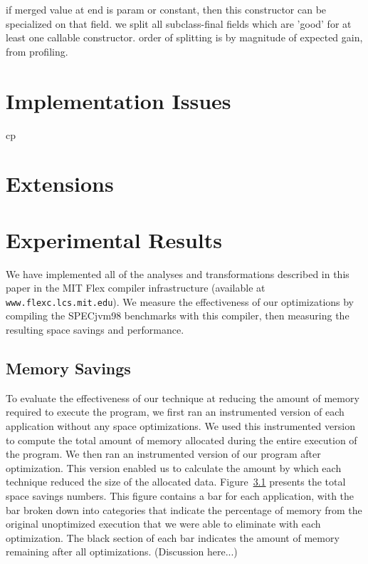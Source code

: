 \documentclass{acmconf}
\begin{document}
if merged value at end is param or constant, then this constructor
can be specialized on that field.  we split all subclass-final fields
which are 'good' for at least one callable constructor.  order of
splitting is by magnitude of expected gain, from profiling.

\section{Implementation Issues}


cp \section{Extensions} %

\section{Experimental Results}
\label{sec:results}

We have implemented all of the analyses and transformations described
in this paper in the MIT Flex compiler infrastructure 
(available at {\tt www.flexc.lcs.mit.edu}). We measure the effectiveness
of our optimizations by compiling the SPECjvm98 benchmarks with 
this compiler, then measuring the resulting space savings and
performance. 

\subsection{Memory Savings}

To evaluate the effectiveness of our technique at reducing the
amount of memory required to execute the program, 
we first ran an instrumented version of each
application without any space optimizations. We used this
instrumented version to compute the total amount of memory 
allocated during the entire execution of the program. 
We then ran an instrumented version of our program after optimization.
This version enabled us to calculate the amount by which each 
technique reduced the size of the allocated data. 
Figure~\ref{} presents the total space savings numbers. This
figure contains a bar for each application, with the bar broken
down into categories that indicate the percentage of memory from 
the original unoptimized execution that we were able to eliminate
with each optimization. The black section of each bar indicates the
amount of memory remaining after all optimizations. 
(Discussion here...)
\end{document}
